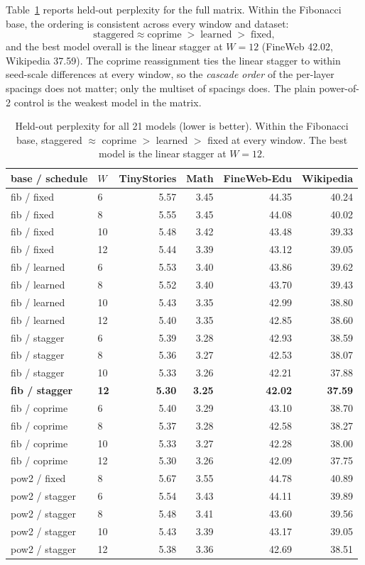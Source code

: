 \documentclass[11pt]{article}
\begin{document}
Table~\ref{tab:matrix} reports held-out perplexity for the full matrix. Within
the Fibonacci base, the ordering is consistent across every window and dataset:
\[
\text{staggered} \approx \text{coprime} \;>\; \text{learned} \;>\; \text{fixed},
\]
and the best model overall is the linear stagger at $W=12$ (FineWeb 42.02,
Wikipedia 37.59). The coprime reassignment ties the linear stagger to within
seed-scale differences at every window, so the \emph{cascade order} of the
per-layer spacings does not matter; only the multiset of spacings does. The
plain power-of-2 control is the weakest model in the matrix.

\begin{table}[htbp]
\centering
\small
\begin{tabular}{llrrrr}
\toprule
base / schedule & $W$ & TinyStories & Math & FineWeb-Edu & Wikipedia \\
\midrule
fib / fixed     & 6  & 5.57 & 3.45 & 44.35 & 40.24 \\
fib / fixed     & 8  & 5.55 & 3.45 & 44.08 & 40.02 \\
fib / fixed     & 10 & 5.48 & 3.42 & 43.48 & 39.33 \\
fib / fixed     & 12 & 5.44 & 3.39 & 43.12 & 39.05 \\
\addlinespace
fib / learned   & 6  & 5.53 & 3.40 & 43.86 & 39.62 \\
fib / learned   & 8  & 5.52 & 3.40 & 43.70 & 39.43 \\
fib / learned   & 10 & 5.43 & 3.35 & 42.99 & 38.80 \\
fib / learned   & 12 & 5.40 & 3.35 & 42.85 & 38.60 \\
\addlinespace
fib / stagger   & 6  & 5.39 & 3.28 & 42.93 & 38.59 \\
fib / stagger   & 8  & 5.36 & 3.27 & 42.53 & 38.07 \\
fib / stagger   & 10 & 5.33 & 3.26 & 42.21 & 37.88 \\
\textbf{fib / stagger} & \textbf{12} & \textbf{5.30} & \textbf{3.25} & \textbf{42.02} & \textbf{37.59} \\
\addlinespace
fib / coprime   & 6  & 5.40 & 3.29 & 43.10 & 38.70 \\
fib / coprime   & 8  & 5.37 & 3.28 & 42.58 & 38.27 \\
fib / coprime   & 10 & 5.33 & 3.27 & 42.28 & 38.00 \\
fib / coprime   & 12 & 5.30 & 3.26 & 42.09 & 37.75 \\
\addlinespace
pow2 / fixed    & 8  & 5.67 & 3.55 & 44.78 & 40.89 \\
pow2 / stagger  & 6  & 5.54 & 3.43 & 44.11 & 39.89 \\
pow2 / stagger  & 8  & 5.48 & 3.41 & 43.60 & 39.56 \\
pow2 / stagger  & 10 & 5.43 & 3.39 & 43.17 & 39.05 \\
pow2 / stagger  & 12 & 5.38 & 3.36 & 42.69 & 38.51 \\
\bottomrule
\end{tabular}
\caption{Held-out perplexity for all 21 models (lower is better). Within the
Fibonacci base, staggered $\approx$ coprime $>$ learned $>$ fixed at every
window. The best model is the linear stagger at $W{=}12$.}
\label{tab:matrix}
\end{table}
\end{document}
